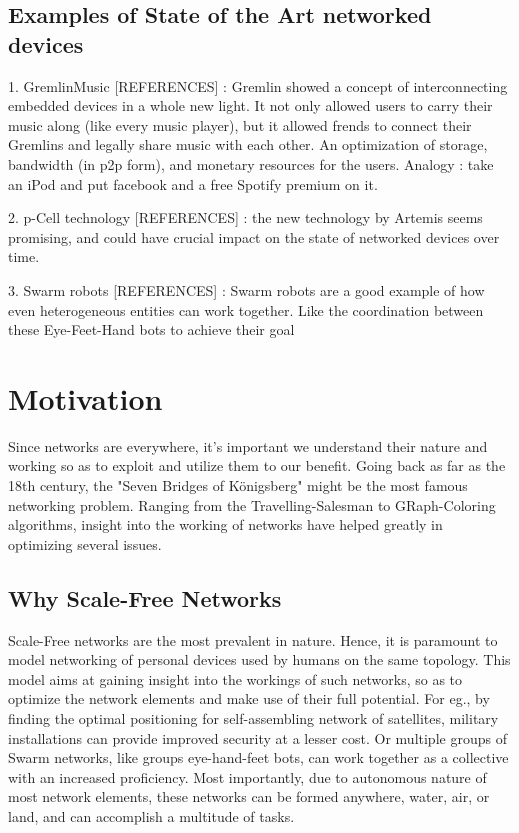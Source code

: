\subsection{Examples of State of the Art networked devices }
1. GremlinMusic [REFERENCES] : Gremlin showed a concept of interconnecting embedded devices in a whole new light. It not only allowed users to carry their music along (like every music player), but it allowed frends to connect their Gremlins and legally share music with each other. An optimization of storage, bandwidth (in p2p form), and monetary resources for the users.  Analogy : take an iPod and put facebook and a free Spotify premium on it.

2. p-Cell technology [REFERENCES] : the new technology by Artemis seems promising, and could have crucial impact on the state of networked devices over time.

3. Swarm robots [REFERENCES] : Swarm robots are a good example of how even heterogeneous entities can work together. Like the coordination between these Eye-Feet-Hand bots to achieve their goal




\section{Motivation}

Since networks are everywhere, it's important we understand their nature and working so as to exploit and utilize them to our benefit.  
Going back as far as the 18th century, the "Seven Bridges of Königsberg" might be the most famous networking problem. Ranging from the Travelling-Salesman to GRaph-Coloring algorithms, insight into the working of networks have helped greatly in optimizing several issues.

\subsection{Why Scale-Free Networks}

Scale-Free networks are the most prevalent in nature. Hence, it is paramount to model networking of personal devices used by humans on the same topology. 
This model aims at gaining insight into the workings of such networks, so as to optimize the network elements and make use of their full potential. For eg., by finding the optimal positioning for self-assembling network of satellites, military installations can provide improved security at a lesser cost. Or multiple groups of Swarm networks, like groups eye-hand-feet bots, can work together as a collective with an increased proficiency.  Most importantly, due to autonomous nature of most network elements, these networks can be formed anywhere, water, air, or land, and can accomplish a multitude of tasks.

